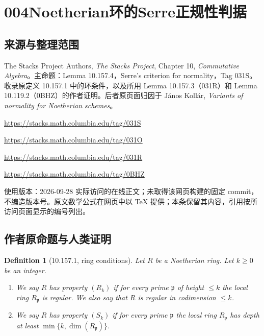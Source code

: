 \documentclass[UTF8,11pt]{ctexart}
\newtheorem*{definition}{Definition}
\begin{document}
\section*{004\quad Noetherian环的Serre正规性判据}
\subsection*{来源与整理范围}
The Stacks Project Authors, \emph{The Stacks Project}, Chapter 10, \emph{Commutative Algebra}。主命题：Lemma 10.157.4，Serre's criterion for normality，Tag 031S。收录原定义 10.157.1 中的环条件，以及所用 Lemma 10.157.3（031R）和 Lemma 10.119.2（0BHZ）的作者证明。后者原页面归因于 J\'anos Koll\'ar, \emph{Variants of normality for Noetherian schemes}。
\par\url{https://stacks.math.columbia.edu/tag/031S}
\par\url{https://stacks.math.columbia.edu/tag/031O}
\par\url{https://stacks.math.columbia.edu/tag/031R}
\par\url{https://stacks.math.columbia.edu/tag/0BHZ}
\par 使用版本：2026-09-28 实际访问的在线正文；未取得该网页构建的固定 commit，不编造版本号。原文数学公式在网页中以 TeX 提供；本条保留其内容，引用按所访问页面显示的编号列出。

\subsection*{作者原命题与人类证明}
\begin{definition}[10.157.1, ring conditions]
Let $R$ be a Noetherian ring. Let $k\geq0$ be an integer.
\begin{enumerate}
\item We say $R$ has property $(R_k)$ if for every prime $\mathfrak p$ of height $\leq k$ the local ring $R_{\mathfrak p}$ is regular. We also say that $R$ is regular in codimension $\leq k$.
\item We say $R$ has property $(S_k)$ if for every prime $\mathfrak p$ the local ring $R_{\mathfrak p}$ has depth at least $\min\{k,\dim(R_{\mathfrak p})\}$.
\end{enumerate}
\end{definition}
\end{document}
